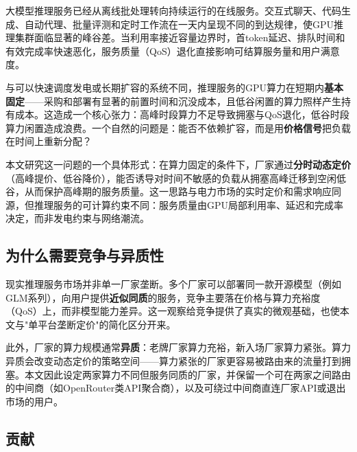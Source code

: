 \documentclass[UTF8,11pt]{ctexart}
\begin{document}
大模型推理服务已经从离线批处理转向持续运行的在线服务。交互式聊天、代码生成、自动代理、批量评测和定时工作流在一天内呈现不同的到达规律，使GPU推理集群面临显著的峰谷差\cite{crankshaw2017clipper,gujarati2020clockwork,yu2022orca,kwon2023pagedattention,agrawal2024sarathiserve}。当利用率接近容量边界时，首token延迟、排队时间和有效完成率快速恶化，服务质量（QoS）退化直接影响可结算服务量和用户满意度。

与可以快速调度发电或长期扩容的系统不同，推理服务的GPU算力在短期内\textbf{基本固定}——采购和部署有显著的前置时间和沉没成本，且低谷闲置的算力照样产生持有成本。这造成一个核心张力：高峰时段算力不足导致拥塞与QoS退化，低谷时段算力闲置造成浪费。一个自然的问题是：能否不依赖扩容，而是用\textbf{价格信号}把负载在时间上重新分配？

本文研究这一问题的一个具体形式：在算力固定的条件下，厂家通过\textbf{分时动态定价}（高峰提价、低谷降价），能否诱导对时间不敏感的负载从拥塞高峰迁移到空闲低谷，从而保护高峰期的服务质量。这一思路与电力市场的实时定价和需求响应同源\cite{schweppe1988spot,borenstein2005long,albadi2008summary,faruqui2010household,siano2014demand}，但推理服务的可计算约束不同：服务质量由GPU局部利用率、延迟和完成率决定，而非发电约束与网络潮流。

\subsection{为什么需要竞争与异质性}

现实推理服务市场并非单一厂家垄断。多个厂家可以部署同一款开源模型（例如GLM系列），向用户提供\textbf{近似同质}的服务，竞争主要落在价格与算力充裕度（QoS）上，而非模型能力差异。这一观察给竞争提供了真实的微观基础，也使本文与"单平台垄断定价"的简化区分开来。

此外，厂家的算力规模通常\textbf{异质}：老牌厂家算力充裕，新入场厂家算力紧张。算力异质会改变动态定价的策略空间——算力紧张的厂家更容易被路由来的流量打到拥塞。本文因此设定两家算力不同但服务同质的厂家，并保留一个可在两家之间路由的中间商（如OpenRouter类API聚合商），以及可绕过中间商直连厂家API或退出市场的用户。

\subsection{贡献}
\end{document}
